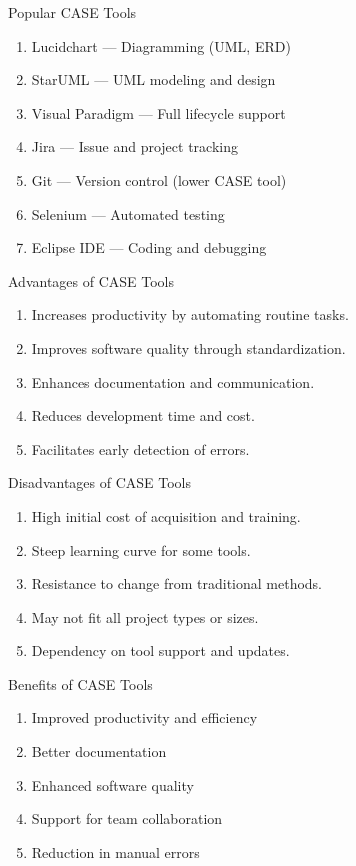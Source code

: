 \documentclass[14pt, aspectratio=169]{beamer}
\begin{document}
\begin{frame}{Popular CASE Tools}
	\begin{enumerate}
		\item Lucidchart — Diagramming (UML, ERD) \pause
		\item StarUML — UML modeling and design \pause
		\item Visual Paradigm — Full lifecycle support \pause
		\item Jira — Issue and project tracking \pause
		\item Git — Version control (lower CASE tool) \pause
		\item Selenium — Automated testing \pause
		\item Eclipse IDE — Coding and debugging
	\end{enumerate}
\end{frame}

\begin{frame}{Advantages of CASE Tools}
	\begin{enumerate}
		\item<1-> Increases productivity by automating routine tasks. \pause
		\item<2-> Improves software quality through standardization. \pause
		\item<3-> Enhances documentation and communication. \pause
		\item<4-> Reduces development time and cost. \pause
		\item<5-> Facilitates early detection of errors.
	\end{enumerate}
\end{frame}

\begin{frame}{Disadvantages of CASE Tools}
	\begin{enumerate}
		\item<1-> High initial cost of acquisition and training. \pause
		\item<2-> Steep learning curve for some tools. \pause
		\item<3-> Resistance to change from traditional methods. \pause
		\item<4-> May not fit all project types or sizes. \pause
		\item<5-> Dependency on tool support and updates.
	\end{enumerate}
\end{frame}

\begin{frame}{Benefits of CASE Tools}
	\begin{enumerate}
		\item<1-> Improved productivity and efficiency \pause
		\item<2-> Better documentation \pause
		\item<3-> Enhanced software quality \pause
		\item<4-> Support for team collaboration \pause
		\item<5-> Reduction in manual errors
	\end{enumerate}
\end{frame}
\end{document}
